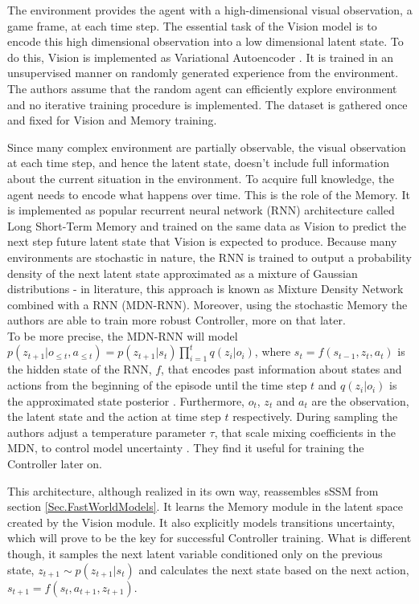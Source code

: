 The environment provides the agent with a high-dimensional visual observation, a game frame, at each time step. The essential task of the Vision model is to encode this high dimensional observation into a low dimensional latent state. To do this, Vision is implemented as Variational Autoencoder \cite{Algo.VAE}. It is trained in an unsupervised manner on randomly generated experience from the environment. The authors assume that the random agent can efficiently explore environment and no iterative training procedure is implemented. The dataset is gathered once and fixed for Vision and Memory training.

Since many complex environment are partially observable, the visual observation at each time step, and hence the latent state, doesn't include full information about the current situation in the environment. To acquire full knowledge, the agent needs to encode what happens over time. This is the role of the Memory. It is implemented as popular recurrent neural network (RNN) architecture called Long Short-Term Memory \cite{Algo.LSTM} and trained on the same data as Vision to predict the next step future latent state that Vision is expected to produce. Because many environments are stochastic in nature, the RNN is trained to output a probability density of the next latent state approximated as a mixture of Gaussian distributions - in literature, this approach is known as Mixture Density Network combined with a RNN \cite{Algo.MDNRNN} (MDN-RNN). Moreover, using the stochastic Memory the authors are able to train more robust Controller, more on that later. \\
To be more precise, the MDN-RNN will model $p(z_{t+1} | o_{\leqslant t}, a_{\leqslant t}) = p(z_{t+1} | s_t) \prod_{i=1}^t q(z_i | o_i)$, where $s_t = f(s_{t-1}, z_t, a_t)$ is the hidden state of the RNN, $f$, that encodes past information about states and actions from the beginning of the episode until the time step $t$ and $q(z_i | o_i)$ is the approximated state posterior \cite{Algo.VAE}. Furthermore, $o_{t}$, $z_{t}$ and $a_{t}$ are the observation, the latent state and the action at time step $t$ respectively. During sampling the authors adjust a temperature parameter $\tau$, that scale mixing coefficients in the MDN, to control model uncertainty \cite{Algo.Sketch-RNN}. They find it useful for training the Controller later on.

This architecture, although realized in its own way, reassembles sSSM from section \ref{Sec.FastWorldModels}. It learns the Memory module in the latent space created by the Vision module. It also explicitly models transitions uncertainty, which will prove to be the key for successful Controller training. What is different though, it samples the next latent variable conditioned only on the previous state, $z_{t+1} \sim p(z_{t+1}|s_t)$ and calculates the next state based on the next action, $s_{t+1} = f(s_t, a_{t+1}, z_{t+1})$.

